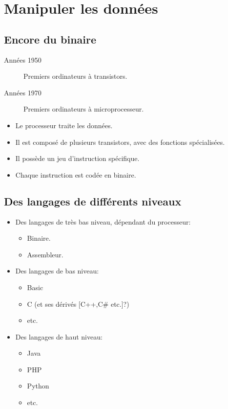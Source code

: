 \section[Manipuler]{Manipuler les données}
\subsection{Encore du binaire}

\begin{slide}
	\begin{description}
		\item[Années 1950] Premiers ordinateurs à transistors.
		\item[Années 1970] Premiers ordinateurs à microprocesseur. %
	\end{description}
\end{slide}

\begin{slide}
	\begin{itemize}
		\item Le processeur traite les données.
		\item Il est composé de plusieurs transistors, avec des fonctions spécialisées.
		\item Il possède un jeu d'instruction spécifique.
		\item Chaque instruction est codée en binaire.
	\end{itemize}
\end{slide}

\subsection{Des langages de différents niveaux}

\begin{slide}
	\begin{itemize}
		\item Des langages de très bas niveau, dépendant du processeur:
		\begin{itemize}
			\item Binaire.
			\item Assembleur.
		\end{itemize}
		\item Des langages de bas niveau:
		\begin{itemize}
			\item Basic
			\item C (et ses dérivés [C++,C\# etc.]?)
			\item etc.
		\end{itemize}
		\item Des langages de haut niveau:
		\begin{itemize}
			\item Java
			\item PHP
			\item Python
			\item etc.
		\end{itemize}
	\end{itemize}
\end{slide}

